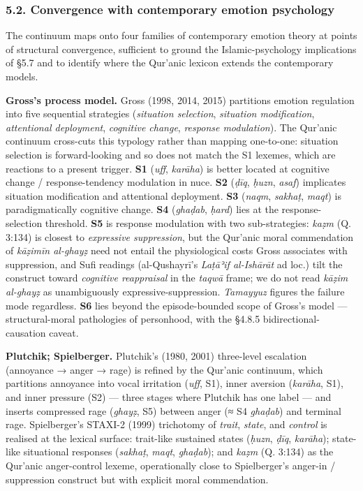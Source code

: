 \documentclass[11pt,a4paper]{article}
\begin{document}
\subsubsection{5.2. Convergence with contemporary emotion
psychology}\label{convergence-with-contemporary-emotion-psychology}

The continuum maps onto four families of contemporary emotion theory at
points of structural convergence, sufficient to ground the
Islamic-psychology implications of §5.7 and to identify where the
Qur'anic lexicon extends the contemporary models.

\textbf{Gross's process model.} Gross (1998, 2014, 2015) partitions
emotion regulation into five sequential strategies (\emph{situation
selection}, \emph{situation modification}, \emph{attentional
deployment}, \emph{cognitive change}, \emph{response modulation}). The
Qur'anic continuum cross-cuts this typology rather than mapping
one-to-one: situation selection is forward-looking and so does not match
the S1 lexemes, which are reactions to a present trigger. \textbf{S1}
(\emph{uff}, \emph{karāha}) is better located at cognitive change /
response-tendency modulation in nuce. \textbf{S2} (\emph{ḍīq},
\emph{ḥuzn}, \emph{asaf}) implicates situation modification and
attentional deployment. \textbf{S3} (\emph{naqm}, \emph{sakhaṭ},
\emph{maqt}) is paradigmatically cognitive change. \textbf{S4}
(\emph{ghaḍab}, \emph{ḥard}) lies at the response-selection threshold.
\textbf{S5} is response modulation with two sub-strategies: \emph{kaẓm}
(Q. 3:134) is closest to \emph{expressive suppression}, but the Qur'anic
moral commendation of \emph{kāẓimīn al-ghayẓ} need not entail the
physiological costs Gross associates with suppression, and Sufi readings
(al-Qushayrī's \emph{Laṭāʾif al-Ishārāt} ad loc.) tilt the construct
toward \emph{cognitive reappraisal} in the \emph{taqwā} frame; we do not
read \emph{kāẓim al-ghayẓ} as unambiguously expressive-suppression.
\emph{Tamayyuz} figures the failure mode regardless. \textbf{S6} lies
beyond the episode-bounded scope of Gross's model --- structural-moral
pathologies of personhood, with the §4.8.5 bidirectional-causation
caveat.

\textbf{Plutchik; Spielberger.} Plutchik's (1980, 2001) three-level
escalation (annoyance → anger → rage) is refined by the Qur'anic
continuum, which partitions annoyance into vocal irritation (\emph{uff},
S1), inner aversion (\emph{karāha}, S1), and inner pressure (S2) ---
three stages where Plutchik has one label --- and inserts compressed
rage (\emph{ghayẓ}, S5) between anger (≈ S4 \emph{ghaḍab}) and terminal
rage. Spielberger's STAXI-2 (1999) trichotomy of \emph{trait},
\emph{state}, and \emph{control} is realised at the lexical surface:
trait-like sustained states (\emph{ḥuzn}, \emph{ḍīq}, \emph{karāha});
state-like situational responses (\emph{sakhaṭ}, \emph{maqt},
\emph{ghaḍab}); and \emph{kaẓm} (Q. 3:134) as the Qur'anic anger-control
lexeme, operationally close to Spielberger's anger-in / suppression
construct but with explicit moral commendation.
\end{document}
